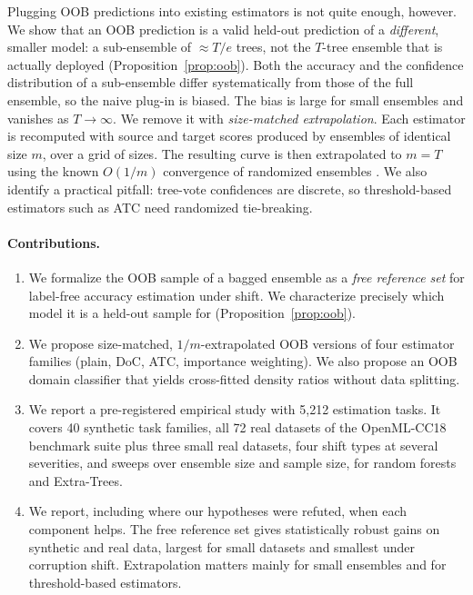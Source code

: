 Plugging OOB predictions into existing estimators is not quite enough, however. We show that an OOB prediction is a valid held-out prediction of a \emph{different}, smaller model: a sub-ensemble of $\approx T/e$ trees, not the $T$-tree ensemble that is actually deployed (Proposition~\ref{prop:oob}). Both the accuracy and the confidence distribution of a sub-ensemble differ systematically from those of the full ensemble, so the naive plug-in is biased. The bias is large for small ensembles and vanishes as $T\to\infty$. We remove it with \emph{size-matched extrapolation}. Each estimator is recomputed with source and target scores produced by ensembles of identical size $m$, over a grid of sizes. The resulting curve is then extrapolated to $m=T$ using the known $O(1/m)$ convergence of randomized ensembles \citep{ng2001voting,lopes2016sharp,cannings2017rp,lopes2019aos}. We also identify a practical pitfall: tree-vote confidences are discrete, so threshold-based estimators such as ATC need randomized tie-breaking.

\paragraph{Contributions.}
\begin{enumerate}
\item We formalize the OOB sample of a bagged ensemble as a \emph{free reference set} for label-free accuracy estimation under shift. We characterize precisely which model it is a held-out sample for (Proposition~\ref{prop:oob}).
\item We propose size-matched, $1/m$-extrapolated OOB versions of four estimator families (plain, DoC, ATC, importance weighting). We also propose an OOB domain classifier that yields cross-fitted density ratios without data splitting.
\item We report a pre-registered empirical study with 5{,}212 estimation tasks. It covers 40 synthetic task families, all 72 real datasets of the OpenML-CC18 benchmark suite \citep{bischl2021openml} plus three small real datasets, four shift types at several severities, and sweeps over ensemble size and sample size, for random forests and Extra-Trees.
\item We report, including where our hypotheses were refuted, when each component helps. The free reference set gives statistically robust gains on synthetic and real data, largest for small datasets and smallest under corruption shift. Extrapolation matters mainly for small ensembles and for threshold-based estimators.
\end{enumerate}

